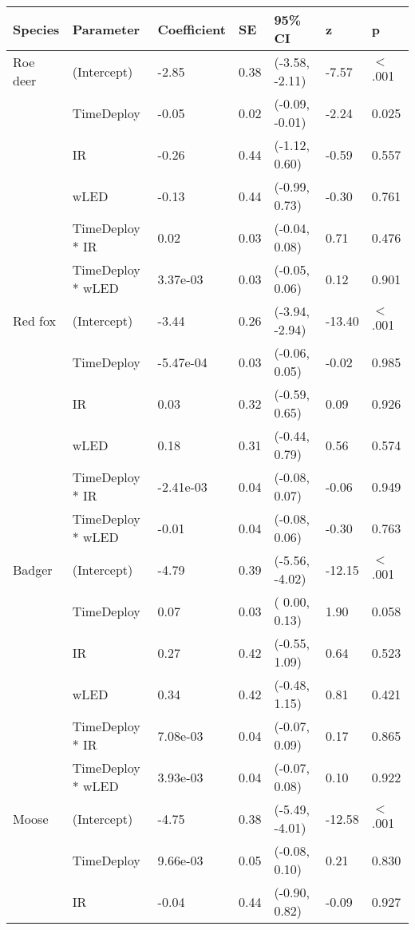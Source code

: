 \begin{table}[ht]
\centering
\begin{tabular}{lllllll}
  \hline
Species & Parameter & Coefficient & SE & 95\% CI & z & p \\ 
  \hline
Roe deer & (Intercept) & -2.85 & 0.38 & (-3.58, -2.11) & -7.57 & $<$ .001 \\ 
   & TimeDeploy & -0.05 & 0.02 & (-0.09, -0.01) & -2.24 & 0.025  \\ 
   & IR & -0.26 & 0.44 & (-1.12,  0.60) & -0.59 & 0.557  \\ 
   & wLED & -0.13 & 0.44 & (-0.99,  0.73) & -0.30 & 0.761  \\ 
   & TimeDeploy * IR & 0.02 & 0.03 & (-0.04,  0.08) & 0.71 & 0.476  \\ 
   & TimeDeploy * wLED & 3.37e-03 & 0.03 & (-0.05,  0.06) & 0.12 & 0.901  \\ 
  Red fox & (Intercept) & -3.44 & 0.26 & (-3.94, -2.94) & -13.40 & $<$ .001 \\ 
   & TimeDeploy & -5.47e-04 & 0.03 & (-0.06,  0.05) & -0.02 & 0.985  \\ 
   & IR & 0.03 & 0.32 & (-0.59,  0.65) & 0.09 & 0.926  \\ 
   & wLED & 0.18 & 0.31 & (-0.44,  0.79) & 0.56 & 0.574  \\ 
   & TimeDeploy * IR & -2.41e-03 & 0.04 & (-0.08,  0.07) & -0.06 & 0.949  \\ 
   & TimeDeploy * wLED & -0.01 & 0.04 & (-0.08,  0.06) & -0.30 & 0.763  \\ 
  Badger & (Intercept) & -4.79 & 0.39 & (-5.56, -4.02) & -12.15 & $<$ .001 \\ 
   & TimeDeploy & 0.07 & 0.03 & ( 0.00,  0.13) & 1.90 & 0.058  \\ 
   & IR & 0.27 & 0.42 & (-0.55,  1.09) & 0.64 & 0.523  \\ 
   & wLED & 0.34 & 0.42 & (-0.48,  1.15) & 0.81 & 0.421  \\ 
   & TimeDeploy * IR & 7.08e-03 & 0.04 & (-0.07,  0.09) & 0.17 & 0.865  \\ 
   & TimeDeploy * wLED & 3.93e-03 & 0.04 & (-0.07,  0.08) & 0.10 & 0.922  \\ 
  Moose & (Intercept) & -4.75 & 0.38 & (-5.49, -4.01) & -12.58 & $<$ .001 \\ 
   & TimeDeploy & 9.66e-03 & 0.05 & (-0.08,  0.10) & 0.21 & 0.830  \\ 
   & IR & -0.04 & 0.44 & (-0.90,  0.82) & -0.09 & 0.927  \\ 

\end{tabular}
\end{table}
